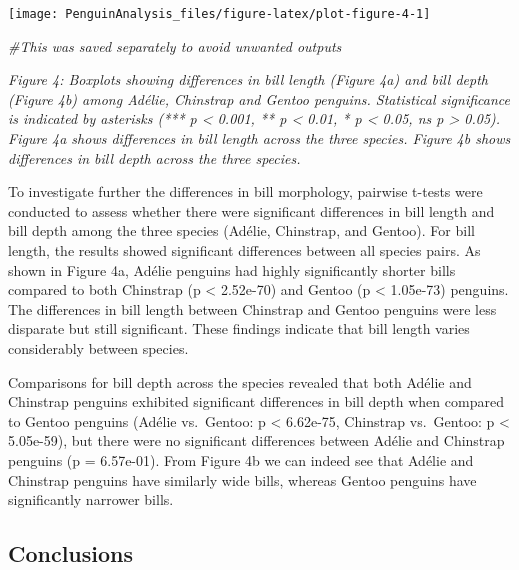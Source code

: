 \documentclass[
]{article}
\newenvironment{Shaded}{\begin{snugshade}}{\end{snugshade}}
\newcommand{\CommentTok}[1]{\textcolor[rgb]{0.56,0.35,0.01}{\textit{#1}}}
\begin{document}
\begin{center}\texttt{[image: PenguinAnalysis\_files/figure-latex/plot-figure-4-1]} \end{center}

\begin{Shaded}
\begin{Highlighting}[]
\CommentTok{\#This was saved separately to avoid unwanted outputs}
\end{Highlighting}
\end{Shaded}

\emph{Figure 4: Boxplots showing differences in bill length (Figure 4a)
and bill depth (Figure 4b) among Adélie, Chinstrap and Gentoo penguins.
Statistical significance is indicated by asterisks (*** p \textless{}
0.001, ** p \textless{} 0.01, * p \textless{} 0.05, ns p \textgreater{}
0.05). Figure 4a shows differences in bill length across the three
species. Figure 4b shows differences in bill depth across the three
species.}

To investigate further the differences in bill morphology, pairwise
t-tests were conducted to assess whether there were significant
differences in bill length and bill depth among the three species
(Adélie, Chinstrap, and Gentoo). For bill length, the results showed
significant differences between all species pairs. As shown in Figure
4a, Adélie penguins had highly significantly shorter bills compared to
both Chinstrap (p \textless{} 2.52e-70) and Gentoo (p \textless{}
1.05e-73) penguins. The differences in bill length between Chinstrap and
Gentoo penguins were less disparate but still significant. These
findings indicate that bill length varies considerably between species.

Comparisons for bill depth across the species revealed that both Adélie
and Chinstrap penguins exhibited significant differences in bill depth
when compared to Gentoo penguins (Adélie vs.~Gentoo: p \textless{}
6.62e-75, Chinstrap vs.~Gentoo: p \textless{} 5.05e-59), but there were
no significant differences between Adélie and Chinstrap penguins (p =
6.57e-01). From Figure 4b we can indeed see that Adélie and Chinstrap
penguins have similarly wide bills, whereas Gentoo penguins have
significantly narrower bills.

\subsection{Conclusions}\label{conclusions}
\end{document}
